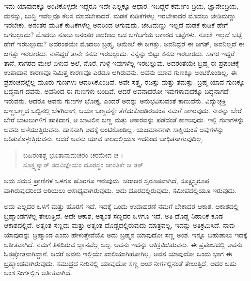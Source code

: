 ಇದು ಯಾವುದಕ್ಕೂ ಅಂಟಿಕೊಳ್ಳದೇ ಇದ್ದರೂ ಇದೇ ಎಲ್ಲಕ್ಕೂ ಆಧಾರ. ಇದಿದ್ದರೆ ಕರ್ಮೇಂ ದ್ರಿಯ, ಜ್ಞಾನೇಂದ್ರಿಯ, ಮನಸ್ಸು, ಬುದ್ಧಿ ಇವೆಲ್ಲವೂ ಕೆಲಸ ಮಾಡಬೇಕಾದರೆ. ಮಡಕೆ ಕುಡಿಕೆಗಳೆಲ್ಲ ಇರಬೇಕಾದರೆ ಮೊದಲು ಜೇಡಿಮಣ್ಣು ಇರಬೇಕು, ಅನಂತರ ಮಡಿಕೆ ಕುಡಿಕೆಗಳೆಲ್ಲ ಅದರಿಂದ ಆಗುವುದು. ಜೇಡಿಮಣ್ಣು ಇಲ್ಲದೆ ಮಡಕೆ ಕುಡಿಕೆ ಹೇಗೆ ಆಗಬಲ್ಲುದು? ಮೊದಲು ನೂಲು ಅನಂತರ ಅದರಿಂದ ಆದ ಬಗೆಬಗೆಯ ಆಕಾರದ ಬಟ್ಟೆಗಳು. ನೂಲೇ ಇಲ್ಲದೆ ಬಟ್ಟೆ ಹೇಗೆ ಇರಬಲ್ಲುದು? ಅದರಂತೆಯೇ ಮೊದಲು ಬ್ರಹ್ಮ, ಆಮೇಲೆ ಈ ಜಗತ್ತು. ಅವನಿದ್ದರೆ ಈ ಜಗತ್, ಅವನಿಲ್ಲದೆ ಈ ಜಗತ್ತು ಇರಲಾರದು. ನಾನಿದ್ದರೆ ತಾನೇ ಕನಸು ಇರಬಲ್ಲುದು. ನನ್ನನ್ನು ಬಿಟ್ಟು ಕನಸು ಇರಲಾರದು. ಸಾಗರ ಇದ್ದರೆ ತಾನೆ, ಸಾಗರದ ಮೇಲೆ ಏಳುವ ಅಲೆ, ನೊರೆ, ಗುಳ್ಳೆ ಇವುಗಳೆಲ್ಲ ಇರಬಲ್ಲುವು. ಅದರಂತೆಯೇ ಬ್ರಹ್ಮ ಈ ಪ್ರಪಂಚಕ್ಕೆ ಉಪಾದಾನ ಕಾರಣವೂ ನಿಮಿತ್ತ ಕಾರಣವೂ ಎರಡೂ ಆಗಿರುವನು. ಅವನು ಯಾವ ಗುಣಕ್ಕೂ ಅಂಟಿಕೊಂಡಿಲ್ಲ. ಈ ಪ್ರಪಂಚದಲ್ಲೆಲ್ಲ ಮೂರು ಗುಣಗಳು ಆವರಿಸಿಕೊಂಡಿವೆ. ಅವೇ ಸತ್ತ್ವ, ರಜಸ್ಸು ಮತ್ತು ತಮಸ್ಸು. ಬ್ರಹ್ಮ ಯಾವ ಗುಣಕ್ಕೂ ಬದ್ಧನಾಗ ದವನು. ಅವನಿಂದ ಈ ಗುಣಗಳು ಬಂದಿವೆ. ಆದರೆ ಅವನಾದರೋ ಇವುಗಳಾವುದಕ್ಕೂ ಬದ್ಧನಾಗದೆ ಇರುವನು. ಆದರೂ ಅವನು ಗುಣಗಳ ಭೋಕ್ತೃ. ಎಂದರೆ ಅದನ್ನು ಅನುಭವಿಸುವಂತೆ ಕಾಣುವನು. ವಿದ್ಯುಚ್ಛಕ್ತಿ ಬಣ್ಣಬಣ್ಣದ ಬಲ್ಬಿನಲ್ಲಿ ಬೆಳಗಿದಾಗ, ಆಯಾ ಬಣ್ಣವನ್ನೇ ತೆಗೆದುಕೊಂಡಿರುವಂತೆ ನಮಗೆ ಕಾಣುವುದು. ನೀರನ್ನು ಬೇರೆ ಬೇರೆ ಬಾಟಲುಗಳಿಗೆ ಹಾಕಿದಾಗ, ಆ ಬಾಟಲಿನ ಬಣ್ಣ ಮತ್ತು ಆಕಾರವನ್ನು ಪಡೆದಂತೆ ಕಾಣುವುದು. ಇಲ್ಲಿ ಗುಣಗಳನ್ನು ಅವನು ಅಳೆಯುತ್ತಿರುವನು. ದಾಸನಾಗಿ ಅದಕ್ಕೆ ಅಂಟಿಕೊಂಡಿಲ್ಲ. ಯಜಮಾನನಾಗಿ ಸಾಕ್ಷಿಯಂತೆ ಅವುಗಳನ್ನು ಅರಿತುಕೊಳ್ಳುತ್ತಿರುವನು. ಆದರೆ ಅವನು ಯಾವ ಕಾಲದಲ್ಲಿಯೂ ಇದರಿಂದ ಬಾಧಿತನಾಗುವುದಿಲ್ಲ.

\begin{verse}
ಬಹಿರಂತಶ್ಚ ಭೂತಾನಾಮಚರಂ ಚರಮೇವ ಚ ।\\ಸೂಕ್ಷ್ಮತ್ವಾತ್ ತದವಿಜ್ಞೇಯಂ ದೂರಸ್ಥಂ ಚಾಂತಿಕೇ ಚ ತತ್ 
\end{verse}

{\small ಅದು ಸಮಸ್ತ ಪ್ರಾಣಿಗಳ ಒಳಗೂ ಹೊರಗೂ ಇರುವುದು. ಚರಾಚರ ಸ್ವರೂಪವಾಗಿದೆ, ಸೂಕ್ಷ್ಮಸ್ವರೂಪ ವಾಗಿರುವುದರಿಂದ ಅರಿಯಲು ಅಸಾಧ್ಯವಾಗಿರುವುದು. ಅದು ದೂರದಲ್ಲಿರುವುದು, ಸಮೀಪದಲ್ಲಿಯೂ ಇರುವುದು.}

ಅದು ಎಲ್ಲದರ ಒಳಗೆ ಮತ್ತು ಹೊರಗೆ ಇದೆ. ಇದಕ್ಕೆ ಒಂದು ಉದಾಹರಣೆ ನಮಗೆ ಬೇಕಾದರೆ ಆಕಾಶ. ಆಕಾಶದಲ್ಲಿ ಬ್ರಹ್ಮಾಂಡಗಳೆಲ್ಲ ತೇಲುತ್ತಿದೆ. ಅದೇ ಆಕಾಶ, ಅತ್ಯಂತ ಸಣ್ಣದರ ಒಳಗೂ ಇದೆ. ಅತಿ ದೊಡ್ಡ ನಿಹಾರಿಕೆ ಕೂಡ ಆಕಾಶದಲ್ಲಿದೆ. ಅತ್ಯಂತ ಸಣ್ಣದು ಮತ್ತು ಅತ್ಯಂತ ದೊಡ್ಡದಲ್ಲಿರುವುದು ಮಾತ್ರವಲ್ಲ, ಇದನ್ನು ಅತಿಕ್ರಮಿಸಿದೆ. ನಾವು ಯಾವುದನ್ನು ಬ್ರಹ್ಮಾಂಡ ಎಂದು ಹೇಳುತ್ತೇವೆಯೊ ಅದು ಬ್ರಹ್ಮನ ಯಾವುದೋ ಸಣ್ಣ ಅಂಶ. ಇನ್ನೂ ಬಹುಪಾಲು ಇದಕ್ಕೆ ಅತೀತವಾಗಿದೆ. ನಮಗೆ ತಿಳಿದಿರುವ ಜ್ಞಾನವೆಲ್ಲ ಅಲ್ಪ. ಅವನು ಇದನ್ನು ಅತಿಕ್ರಮಿಸಿರುವನು. ಈ ಪ್ರಪಂಚದಲ್ಲಿ ಅವನು ಓತಪ್ರೋತನಾಗಿದ್ದಾನೆ. ಆದರೆ ಅವನು ಇಲ್ಲಿಯೇ ಖಾಲಿಯಾಗಿಹೋಗಿಲ್ಲ. ಅವನ ಯಾವುದೋ ಒಂದು ಭಾಗ ಈ ಬ್ರಹ್ಮಾಂಡವಾಗಿರುವುದು. ಸಮುದ್ರದ ನೀರಿನಲ್ಲಿ ಯಾವುದೋ ಸಣ್ಣ ಅಂಶ ನೀರ್ಗಲ್ಲಿನಂತೆ  ತೇಲುತ್ತಿದೆ. ಅದರ ಬಹು ಅಂಶ ನೀರ್ಗಲ್ಲಿಗೆ ಅತೀತವಾಗಿದೆ.


